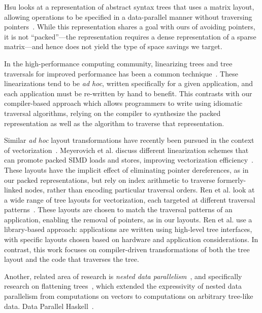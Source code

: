 Hsu looks at a representation of abstract syntax trees that uses a matrix
layout, allowing operations to be specified in a data-parallel manner without
traversing pointers~\cite{hsu2016key}. While this representation shares a goal
with ours of avoiding pointers, it is not ``packed''---the representation
requires a dense representation of a sparse matrix---and hence does not yield
the type of space savings we target.

In the high-performance computing community, linearizing trees and tree traversals for improved
performance has been a common technique~\cite{makino90,goldfarb13sc}. These
linearizations tend to be {\em ad hoc}, written specifically for a given
application, and each application must be re-written by hand to benefit. This
contrasts with our compiler-based approach which allows programmers to write
using idiomatic traversal algorithms, relying on the compiler to synthesize
the packed representation as well as the algorithm to traverse that
representation.

Similar {\em ad hoc} layout transformations have recently been pursued in the
context of vectorization~\cite{Meyerovich2011,ren13cgo,ren14taco}. Meyerovich
et al. discuss different linearization schemes that can promote packed SIMD
loads and stores, improving vectorization efficiency~\cite{Meyerovich2011}.
These layouts have the implicit effect of eliminating pointer dereferences, as
in our packed representations, but rely on index arithmetic to traverse
formerly-linked nodes, rather than encoding particular traversal orders. Ren
et al. look at a wide range of tree layouts for vectorization, each targeted
at different traversal patterns~\cite{ren13cgo,ren14taco}. These layouts are
chosen to match the traversal patterns of an application, enabling the removal
of pointers, as in our layouts. Ren et al. use a library-based approach:
applications are written using high-level tree interfaces, with specific
layouts chosen based on hardware and application considerations. In contrast,
this work focuses on compiler-driven transformations of both the tree layout
and the code that traverses the tree.

Another, related area of research is
\emph{nested data parallelism}~\cite{nested-data-parallelism},
and specifically research on
flattening trees~\cite{flattening-trees}, which extended the expressivity of
nested data parallelism from computations on vectors to computations on
arbitrary tree-like data.
Data Parallel Haskell~\cite{data-parallel-haskell}.
